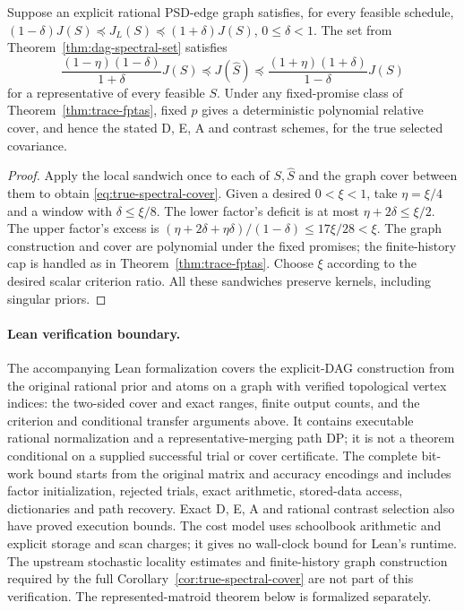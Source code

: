 \begin{corollary}
\label{cor:true-spectral-cover}
Suppose an explicit rational PSD-edge graph satisfies, for every feasible
schedule, $(1-\delta)J(S)\preceq J_L(S)\preceq(1+\delta)J(S)$,
$0\le\delta<1$. The set from Theorem~\ref{thm:dag-spectral-set} satisfies
\begin{equation}
 \frac{(1-\eta)(1-\delta)}{1+\delta}J(S)
 \preceq J(\widehat S)\preceq
 \frac{(1+\eta)(1+\delta)}{1-\delta}J(S)
 \label{eq:true-spectral-cover}
\end{equation}
for a representative of every feasible $S$. Under any fixed-promise class
of Theorem~\ref{thm:trace-fptas}, fixed $p$ gives a deterministic polynomial
relative cover, and hence the stated D, E, A and contrast schemes, for the
true selected covariance.
\end{corollary}
\begin{proof}
Apply the local sandwich once to each of $S,\widehat S$ and the graph
cover between them to obtain \eqref{eq:true-spectral-cover}. Given a desired
$0<\xi<1$, take $\eta=\xi/4$ and a window with $\delta\le\xi/8$.
The lower factor's deficit is at most $\eta+2\delta\le\xi/2$. The upper
factor's excess is $(\eta+2\delta+\eta\delta)/(1-\delta)\le17\xi/28<\xi$.
The graph construction and cover are polynomial under the fixed promises;
the finite-history cap is handled as in Theorem~\ref{thm:trace-fptas}.
Choose $\xi$ according to the desired scalar criterion ratio. All these
sandwiches preserve kernels, including singular priors.
\end{proof}

\paragraph{Lean verification boundary.}
The accompanying Lean formalization covers the explicit-DAG
construction from the original rational prior and atoms on a graph with
verified topological vertex indices: the two-sided cover and exact ranges,
finite output counts, and the criterion and conditional transfer arguments
above. It contains executable rational normalization and a
representative-merging path DP; it is not a theorem conditional on a supplied
successful trial or cover certificate. The complete bit-work bound starts
from the original matrix and accuracy encodings and includes factor
initialization, rejected trials, exact arithmetic, stored-data access,
dictionaries and path recovery. Exact D, E, A and rational contrast selection
also have proved execution bounds. The cost model uses schoolbook arithmetic
and explicit storage and scan charges; it gives no wall-clock bound for Lean's
runtime. The upstream stochastic locality estimates and finite-history graph
construction required by the full Corollary~\ref{cor:true-spectral-cover} are
not part of this verification. The represented-matroid theorem below is
formalized separately.

